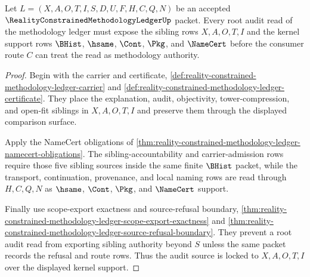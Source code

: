 \begin{theorem}
\label{thm:reality-constrained-methodology-ledger-root-audit-source-lock}
Let $L=(X,A,O,T,I,S,D,U,F,H,C,Q,N)$ be an accepted
$\RealityConstrainedMethodologyLedgerUp$ packet. Every root audit read of the
methodology ledger must expose the sibling rows $X,A,O,T,I$ and the kernel
support rows $\BHist$, $\hsame$, $\Cont$, $\Pkg$, and $\NameCert$ before the
consumer route $C$ can treat the read as methodology authority.
\end{theorem}
\begin{proof}
Begin with the carrier and certificate,
\autoref{def:reality-constrained-methodology-ledger-carrier} and
\autoref{def:reality-constrained-methodology-ledger-certificate}. They place
the explanation, audit, objectivity, tower-compression, and open-fit siblings
in $X,A,O,T,I$ and preserve them through the displayed comparison surface.

Apply the NameCert obligations of
\autoref{thm:reality-constrained-methodology-ledger-namecert-obligations}. The
sibling-accountability and carrier-admission rows require those five sibling
sources inside the same finite $\BHist$ packet, while the transport,
continuation, provenance, and local naming rows are read through
$H,C,Q,N$ as $\hsame$, $\Cont$, $\Pkg$, and $\NameCert$ support.

Finally use scope-export exactness and source-refusal boundary,
\autoref{thm:reality-constrained-methodology-ledger-scope-export-exactness} and
\autoref{thm:reality-constrained-methodology-ledger-source-refusal-boundary}.
They prevent a root audit read from exporting sibling authority beyond $S$
unless the same packet records the refusal and route rows. Thus the audit source
is locked to $X,A,O,T,I$ over the displayed kernel support.
\end{proof}

